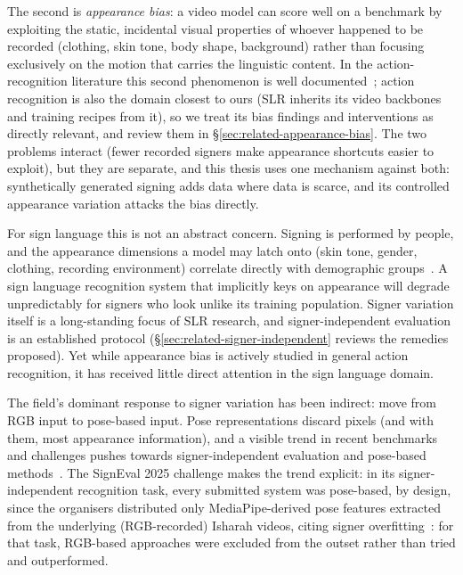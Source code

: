 The second is \emph{appearance bias}: a video model can score well on a benchmark by
exploiting the static, incidental visual properties of whoever happened to
be recorded (clothing, skin tone, body shape, background) rather than focusing exclusively on
the motion that carries the linguistic content. In the action-recognition
literature this second phenomenon is well
documented~\cite{leiRevealingSingleFrame2023, ilicAppearanceFreeAction2022,
liMitigatingEvaluatingStatic2023a, zhangDontJudgeLook2024}; action
recognition is also the domain closest to ours (SLR inherits its video
backbones and training recipes from it), so we treat its bias findings
and interventions as directly relevant, and review them in
\S\ref{sec:related-appearance-bias}. The two
problems interact (fewer recorded signers make appearance shortcuts
easier to exploit), but they are separate, and this thesis uses one
mechanism against both: synthetically generated signing adds data where
data is scarce, and its controlled appearance variation attacks the bias
directly.

For sign language this is not an abstract concern. Signing is performed by
people, and the appearance dimensions a model may latch onto (skin tone,
gender, clothing, recording environment) correlate directly
with demographic groups~\cite{heldrethWhichSkinTone2024,
schumannConsensusSubjectivitySkin2023}. A sign language recognition system that implicitly
keys on appearance will degrade unpredictably for signers who look unlike its
training population. Signer variation itself is a long-standing focus of
SLR research, and signer-independent evaluation is an established
protocol (\S\ref{sec:related-signer-independent} reviews the remedies
proposed). Yet while appearance bias is actively studied in general
action recognition, it has received little direct attention in the sign
language domain.

The field's dominant response to signer variation has been indirect: move
from RGB input to pose-based input. Pose representations discard pixels
(and with them, most appearance information), and a visible trend in recent
benchmarks and challenges pushes towards signer-independent evaluation and
pose-based methods~\cite{jangSigningOutsideStudio2022,
luqmanSignEval2025Challenge2025a, jiangSignCLIPConnectingText2024}. The
SignEval 2025 challenge makes the trend explicit: in its signer-independent
recognition task, every submitted system was pose-based, by design,
since the organisers distributed only MediaPipe-derived pose features
extracted from the underlying (RGB-recorded) Isharah videos, citing signer
overfitting~\cite{luqmanSignEval2025Challenge2025a,
alyamiIsharahLargeScaleMultiScene2026b}: for that task, RGB-based
approaches were excluded from the outset rather than tried and outperformed.

